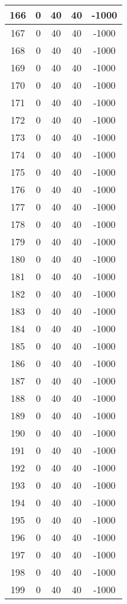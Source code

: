 \documentclass[letterpaper, 12pt]{article}
\begin{document}
\begin{longtable}{|c|c|c|c|c|}
\hline
166 & 0 & 40 & 40 & -1000 \\
\hline
167 & 0 & 40 & 40 & -1000 \\
\hline
168 & 0 & 40 & 40 & -1000 \\
\hline
169 & 0 & 40 & 40 & -1000 \\
\hline
170 & 0 & 40 & 40 & -1000 \\
\hline
171 & 0 & 40 & 40 & -1000 \\
\hline
172 & 0 & 40 & 40 & -1000 \\
\hline
173 & 0 & 40 & 40 & -1000 \\
\hline
174 & 0 & 40 & 40 & -1000 \\
\hline
175 & 0 & 40 & 40 & -1000 \\
\hline
176 & 0 & 40 & 40 & -1000 \\
\hline
177 & 0 & 40 & 40 & -1000 \\
\hline
178 & 0 & 40 & 40 & -1000 \\
\hline
179 & 0 & 40 & 40 & -1000 \\
\hline
180 & 0 & 40 & 40 & -1000 \\
\hline
181 & 0 & 40 & 40 & -1000 \\
\hline
182 & 0 & 40 & 40 & -1000 \\
\hline
183 & 0 & 40 & 40 & -1000 \\
\hline
184 & 0 & 40 & 40 & -1000 \\
\hline
185 & 0 & 40 & 40 & -1000 \\
\hline
186 & 0 & 40 & 40 & -1000 \\
\hline
187 & 0 & 40 & 40 & -1000 \\
\hline
188 & 0 & 40 & 40 & -1000 \\
\hline
189 & 0 & 40 & 40 & -1000 \\
\hline
190 & 0 & 40 & 40 & -1000 \\
\hline
191 & 0 & 40 & 40 & -1000 \\
\hline
192 & 0 & 40 & 40 & -1000 \\
\hline
193 & 0 & 40 & 40 & -1000 \\
\hline
194 & 0 & 40 & 40 & -1000 \\
\hline
195 & 0 & 40 & 40 & -1000 \\
\hline
196 & 0 & 40 & 40 & -1000 \\
\hline
197 & 0 & 40 & 40 & -1000 \\
\hline
198 & 0 & 40 & 40 & -1000 \\
\hline
199 & 0 & 40 & 40 & -1000 \\
\hline
\end{longtable}
\end{document}
